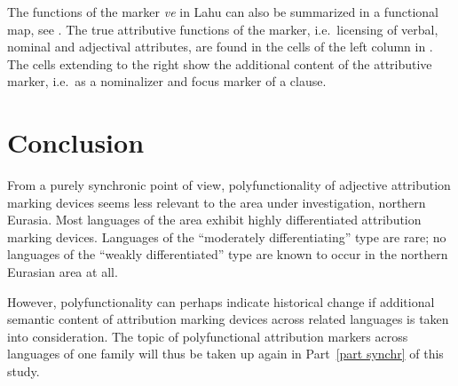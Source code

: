 The functions of the marker \textit{ve} in Lahu can also be summarized in a functional map, see . The true attributive functions of the marker, i.e.~licensing of verbal, nominal and adjectival attributes, are found in the cells of the left column in . The cells extending to the right show the additional content of the attributive marker, i.e.~as a nominalizer and focus marker of a clause.

\section{Conclusion}
From a purely synchronic point of view, polyfunctionality of adjective attribution marking devices seems less relevant to the area under investigation, northern Eurasia. Most languages of the area exhibit highly differentiated attribution marking devices. Languages of the “moderately differentiating” type are rare; no languages of the “weakly differentiated” type are known to occur in the northern Eurasian area at all.

However, polyfunctionality can perhaps indicate historical change if additional semantic content of attribution marking devices across related languages is taken into consideration. The topic of polyfunctional attribution markers across languages of one family will thus be taken up again in Part~\ref{part synchr} of this study.
